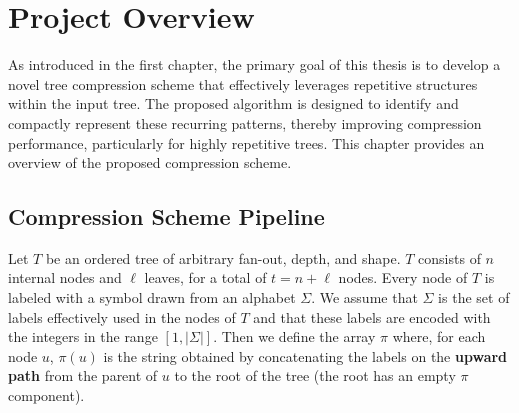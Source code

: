 \chapter{Project Overview} \label{chp:project_overview}
As introduced in the first chapter, the primary goal of this thesis is to develop a novel tree compression scheme that effectively leverages repetitive structures within the input tree. The proposed algorithm is designed to identify and compactly represent these recurring patterns, thereby improving compression performance, particularly for highly repetitive trees. This chapter provides an overview of the proposed compression scheme.

\section{Compression Scheme Pipeline}
Let $ T $ be an ordered tree of arbitrary fan-out, depth, and shape. $ T $ consists of $ n $ internal nodes and $ \ell $ leaves, for a total of $ t = n + \ell $ nodes. Every node of $ T $ is labeled with a symbol drawn from an alphabet $ \Sigma $. We assume that $ \Sigma $ is the set of labels effectively used in the nodes of $T$ and that these labels are encoded with the integers in the range $[1, |\Sigma|]$. Then we define the array $\pi$ where, for each node $u$, $\pi(u)$ is the string obtained by concatenating the labels on the \textbf{upward path} from the parent of $u$ to the root of the tree (the root has an empty $\pi$ component).

